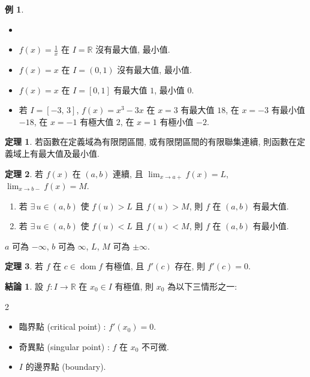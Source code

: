 \documentclass[12pt]{extarticle}
\newcommand{\ds}{\displaystyle}
\DeclareMathOperator*{\dom}{dom}
\theoremstyle{definition}
\newtheorem*{fact}{結論}
\newtheorem*{thm}{定理}
\newtheorem*{ex}{例}
\begin{document}
\begin{ex}
  \begin{itemize}\setlength\itemsep{0em}
    \item[]
    \item $\ds f(x) = \frac{1}{x}$ 在 $I = \mathbb{R}$ 沒有最大值, 最小值. 
    \item $\ds f(x) = x$ 在 $I = (0, 1)$ 沒有最大值, 最小值. 
    \item $\ds f(x) = x$ 在 $I = [0, 1]$ 有最大值 $1$, 最小值 $0$. 
    \item 若 $I = [-3,\,3]$, $\ds f(x) = x^3 - 3x$ 在 $x = 3$ 有最大值 $18$, 在 $x = -3$ 有最小值 $-18$, 在 $x = -1$ 有極大值 $2$, 在 $x = 1$ 有極小值 $-2$. 
  \end{itemize}
\end{ex}

\begin{thm}
  若函數在定義域為{\color{M4}有限閉區間}, 或{\color{M4}有限閉區間的有限聯集}連續, 則函數在定義域上有最大值及最小值. 
\end{thm}

\begin{thm}
  若 $f(x)$ 在 $(a, b)$ 連續, 且 $\ds\lim_{x\to a+}f(x) = L$, $\ds\lim_{x\to b-}f(x) = M$. 
  \begin{enumerate}\setlength\itemsep{0em}
    \item 若 $\exists\,u\in(a, b)$ 使 $f(u) > L$ 且 $f(u) > M$, 則 $f$ 在 $(a, b)$ 有最大值. 
    \item 若 $\exists\,u\in(a, b)$ 使 $f(u) < L$ 且 $f(u) < M$, 則 $f$ 在 $(a, b)$ 有最小值. 
  \end{enumerate}
  $a$ 可為 $-\infty$, $b$ 可為 $\infty$, $L$, $M$ 可為 $\pm\infty$. 
\end{thm}

\begin{thm}
  若 $f$ 在 $c\in\dom f$ 有極值, 且 $f'(c)$ 存在, 則 $f'(c) = 0$. 
\end{thm}

\begin{fact}
  設 $f:I\to\mathbb{R}$ 在 $x_0\in I$ 有極值, 則 $x_0$ 為以下三情形之一: 
  \begin{multicols}{2}
    \begin{itemize}\setlength\itemsep{0em}
      \item 臨界點 (critical point) : $\ds f'(x_0) = 0$. 
      \item 奇異點 (singular point) : $f$ 在 $x_0$ 不可微.  
      \item $I$ 的邊界點 (boundary). 
    \end{itemize}
  \end{multicols}
\end{fact}
\end{document}
